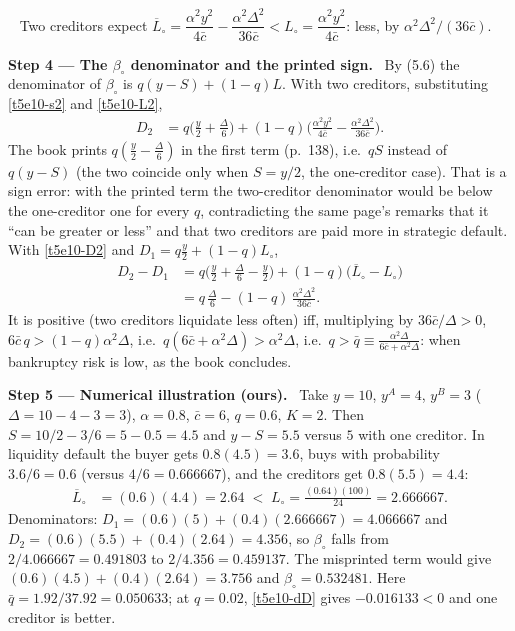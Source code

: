 \documentclass[11pt,a4paper]{article}
\newcommand{\step}[2]{\par\medskip\noindent\textbf{Step #1 --- #2.}~}
\newcommand{\answer}[1]{\par\smallskip\noindent\fbox{\textbf{Answer #1.}}~}
\begin{document}
\answer{(liquidity)} Two creditors expect $\overline L_\circ=\dfrac{\alpha^2y^2}{4\bar c}-\dfrac{\alpha^2\Delta^2}{36\bar c}
<L_\circ=\dfrac{\alpha^2y^2}{4\bar c}$: less, by $\alpha^2\Delta^2/(36\bar c)$.

\step{4}{The $\beta_\circ$ denominator and the printed sign} By (5.6) the denominator of $\beta_\circ$ is $q(y-S)+(1-q)L$. With two creditors,
substituting \eqref{t5e10-s2} and \eqref{t5e10-L2},
\begin{align}
  D_2 &= q\Big(\frac{y}{2}+\frac{\Delta}{6}\Big) + (1-q)\Big(\frac{\alpha^2y^2}{4\bar c}-\frac{\alpha^2\Delta^2}{36\bar c}\Big). \label{t5e10-D2}
\end{align}
The book prints $q(\frac y2-\frac\Delta6)$ in the first term (p.~138), i.e.\ $qS$ instead of $q(y-S)$ (the two coincide only when
$S=y/2$, the one-creditor case). That is a sign error: with the printed term the two-creditor denominator would be below the one-creditor
one for every $q$, contradicting the same page's remarks that it ``can be greater or less'' and that two creditors are paid more in strategic default.
With \eqref{t5e10-D2} and $D_1=q\frac y2+(1-q)L_\circ$,
\begin{align}
  D_2-D_1 &= q\Big(\frac y2+\frac\Delta6-\frac y2\Big)+(1-q)\big(\overline L_\circ-L_\circ\big) \nonumber\\
          &= q\,\frac{\Delta}{6}-(1-q)\,\frac{\alpha^2\Delta^2}{36\bar c}. \label{t5e10-dD}
\end{align}
It is positive (two creditors liquidate less often) iff, multiplying by $36\bar c/\Delta>0$,
$6\bar c\,q>(1-q)\alpha^2\Delta$, i.e.\ $q(6\bar c+\alpha^2\Delta)>\alpha^2\Delta$, i.e.\
$q>\bar q\equiv\frac{\alpha^2\Delta}{6\bar c+\alpha^2\Delta}$: when bankruptcy risk is low, as the book concludes.

\step{5}{Numerical illustration (ours)} Take $y=10$, $y^A=4$, $y^B=3$ ($\Delta=10-4-3=3$), $\alpha=0.8$, $\bar c=6$, $q=0.6$, $K=2$. Then
$S=10/2-3/6=5-0.5=4.5$ and $y-S=5.5$ versus $5$ with one creditor. In liquidity default the buyer gets $0.8(4.5)=3.6$, buys with probability
$3.6/6=0.6$ (versus $4/6=0.666667$), and the creditors get $0.8(5.5)=4.4$:
\begin{align}
  \overline L_\circ &= (0.6)(4.4) = 2.64 \;<\; L_\circ=\frac{(0.64)(100)}{24}=2.666667. \nonumber
\end{align}
Denominators: $D_1=(0.6)(5)+(0.4)(2.666667)=4.066667$ and $D_2=(0.6)(5.5)+(0.4)(2.64)=4.356$, so $\beta_\circ$ falls from
$2/4.066667=0.491803$ to $2/4.356=0.459137$. The misprinted term would give $(0.6)(4.5)+(0.4)(2.64)=3.756$ and $\beta_\circ=0.532481$.
Here $\bar q=1.92/37.92=0.050633$; at $q=0.02$, \eqref{t5e10-dD} gives $-0.016133<0$ and one creditor is better.
\end{document}
